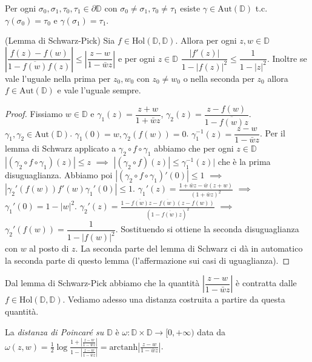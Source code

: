 \begin{exc}
  Per ogni $\sigma_0, \sigma_1, \tau_0, \tau_1 \in \partial\mathbb{D}$ con $\sigma_0\not=\sigma_1, \tau_0\not=\tau_1$ esiste $\gamma \in \text{Aut}(\mathbb{D})$ t.c. $\gamma(\sigma_0)=\tau_0$ e $\gamma(\sigma_1)=\tau_1$.
\end{exc}

\begin{lm}
  (Lemma di Schwarz-Pick) Sia $f \in \text{Hol}(\mathbb{D}, \mathbb{D})$.
  Allora per ogni $z, w \in \mathbb{D}$ $\left|\dfrac{f(z)-f(w)}{1-\overline{f(w)}f(z)}\right| \le \left|\dfrac{z-w}{1-\bar{w}z}\right|$ e per ogni $z \in \mathbb{D}$ $\dfrac{|f'(z)|}{1-|f(z)|^2} \le \dfrac{1}{1-|z|^2}$.
  Inoltre se vale l'uguale nella prima per $z_0, w_0$ con $z_0 \not=w_0$ o nella seconda per $z_0$ allora $f \in \text{Aut}(\mathbb{D})$ e vale l'uguale sempre.
\end{lm}

\begin{proof}
  Fissiamo $w \in \mathbb{D}$ e $\gamma_1(z)=\dfrac{z+w}{1+\bar{w}z}$, $\gamma_2(z)=\dfrac{z-f(w)}{1-\overline{f(w)}z}$. $\gamma_1, \gamma_2 \in \text{Aut}(\mathbb{D})$. $\gamma_1(0)=w, \gamma_2(f(w))=0$.
  $\gamma_1^{-1}(z)=\dfrac{z-w}{1-\bar{w}z}$.
  Per il lemma di Schwarz applicato a $\gamma_2 \circ f \circ \gamma_1$ abbiamo che per ogni $z \in \mathbb{D}$ $|(\gamma_2 \circ f \circ \gamma_1)(z)| \le z$ $\implies$ $|(\gamma_2 \circ f)(z)| \le \gamma_1^{-1}(z)|$ che è la prima disuguaglianza.
  Abbiamo poi $|(\gamma_2 \circ f \circ \gamma_1)'(0)| \le 1$ $\implies$ $|\gamma_2'(f(w))f'(w)\gamma_1'(0)| \le 1$. $\gamma_1'(z)=\frac{1+\bar{w}z-\bar{w}(z+w)}{(1+\bar{w}z)^2}$ $\implies$ $\gamma_1'(0)=1-|w|^2$.
  $\gamma_2'(z)=\frac{1-\overline{f(w)}z-\overline{f(w)}(z-f(w))}{(1-\overline{f(w)}z)^2}$ $\implies$ $\gamma_2'(f(w))=\dfrac{1}{1-|f(w)|^2}$. Sostituendo si ottiene la seconda disuguaglianza con $w$ al posto di $z$. La seconda parte del lemma di Schwarz ci dà in automatico la seconda parte di questo lemma (l'affermazione sui casi di uguaglianza).
\end{proof}

Dal lemma di Schwarz-Pick abbiamo che la quantità $\left|\dfrac{z-w}{1-\bar{w}z}\right|$ è contratta dalle $f \in \text{Hol}(\mathbb{D}, \mathbb{D})$. Vediamo adesso una distanza costruita a partire da questa quantità.

\begin{defn}
  La \textit{distanza di Poincaré su $\mathbb{D}$} è $\omega: \mathbb{D} \times \mathbb{D} \longrightarrow [0, +\infty)$
  data da $\displaystyle \omega(z, w)=\frac{1}{2}\log{\frac{1+\left|\frac{z-w}{1-\bar{w}z}\right|}{1-\left|\frac{z-w}{1-\bar{w}z}\right|}}=\text{arctanh}{\left|\frac{z-w}{1-\bar{w}z}\right|}$.
\end{defn}

